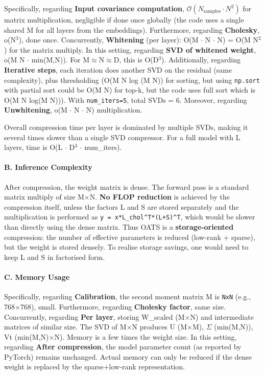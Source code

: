 Specifically, regarding \textbf{Input covariance computation}, $\mathcal{O}(N_{\text{samples}} \cdot N^2)$ for matrix multiplication, negligible if done once globally (the code uses a single shared M for all layers from the embeddings). Furthermore, regarding \textbf{Cholesky}, o(N$^3$), done once. Concurrently, \textbf{Whitening} (per layer): O(M $\cdot$ N $\cdot$ N) = O(M N$^2$) for the matrix multiply. In this setting, regarding \textbf{SVD of whitened weight}, o(M N $\cdot$ min(M,N)). For M$\approx$N$\approx$D, this is O(D$^3$). Additionally, regarding \textbf{Iterative steps}, each iteration does another SVD on the residual (same complexity), plus thresholding (O(M N log (M N)) for sorting, but using \texttt{np.sort} with partial sort could be O(M N) for top-k, but the code uses full sort which is O(M N log(M N))). With \texttt{num\_iters=5}, total SVDs = 6. Moreover, regarding \textbf{Unwhitening}, o(M $\cdot$ N $\cdot$ N) multiplication.


Overall compression time per layer is dominated by multiple SVDs, making it several times slower than a single SVD compressor. For a full model with L layers, time is O(L $\cdot$ D$^3$ $\cdot$ num\_iters).

\paragraph{B. Inference Complexity}

After compression, the weight matrix is dense. The forward pass is a standard matrix multiply of size M$\times$N. \textbf{No FLOP reduction} is achieved by the compression itself, unless the factors L and S are stored separately and the multiplication is performed as \texttt{y = x*L\_chol\textasciicircum{}T*(L+S)\textasciicircum{}T}, which would be slower than directly using the dense matrix. Thus OATS is a \textbf{storage-oriented} compression: the number of effective parameters is reduced (low-rank + sparse), but the weight is stored densely. To realise storage savings, one would need to keep L and S in factorised form.

\paragraph{C. Memory Usage}

Specifically, regarding \textbf{Calibration}, the second moment matrix M is \texttt{NxN} (e.g., 768$\times$768), small. Furthermore, regarding \textbf{Cholesky factor}, same size. Concurrently, regarding \textbf{Per layer}, storing W\_scaled (M$\times$N) and intermediate matrices of similar size. The SVD of M$\times$N produces U (M$\times$M), $\Sigma$ (min(M,N)), Vt (min(M,N)$\times$N). Memory is a few times the weight size. In this setting, regarding \textbf{After compression}, the model parameter count (as reported by PyTorch) remains unchanged. Actual memory can only be reduced if the dense weight is replaced by the sparse+low-rank representation.



